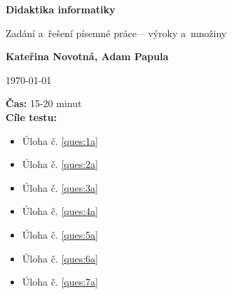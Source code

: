 \documentclass[12pt,a4paper,addpoints]{exam}
\def\maintitle{Didaktika informatiky}
\def\subtitle{Zadání a~řešení písemné práce -- výroky a~množiny}
\def\authorname{Kateřina Novotná, Adam Papula}
\begin{document}
    \begin{titlepage}
        \begin{center}
            \Large\textbf{{\maintitle}}

            \normalsize
            \vspace{0.5cm}
                \subtitle
            \vspace{1.5cm}
            
            \textbf{\authorname}
            \vspace{1.5cm}

            \today
            \vfill
            
            \raggedright
                \textbf{Čas:} 15-20 minut\\
                \textbf{Cíle testu:}
                \noindent
                \footnotesize
                \begin{itemize}[topsep=0pt]
                \item Úloha č. \ref{ques:1a}\\
                \item Úloha č. \ref{ques:2a}\\
                \item Úloha č. \ref{ques:3a}\\
                \item Úloha č. \ref{ques:4a}\\
                \item Úloha č. \ref{ques:5a}\\
                \item Úloha č. \ref{ques:6a}\\
                \item Úloha č. \ref{ques:7a}\\

                \end{itemize}
        \end{center}
    \end{titlepage}

    
    

    \printanswers
    
    
\end{document}
